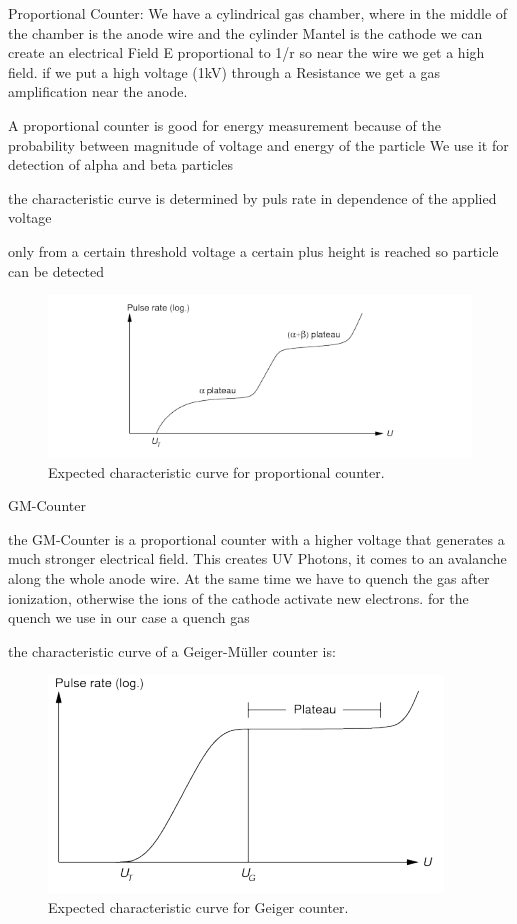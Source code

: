 Proportional Counter:
We have a cylindrical gas chamber, where in the middle of the chamber is the anode wire and the cylinder Mantel
is the cathode
we can create an electrical Field E proportional to 1/r so near the wire we get a high field.
if we put a high voltage (1kV) through a Resistance we get a gas amplification near the anode.

A proportional counter is good for energy measurement because of the probability between magnitude of voltage and energy of the particle 
We use it for detection of alpha and beta particles


the characteristic curve is determined by puls rate in dependence of the applied voltage



only from a certain threshold voltage a certain plus height is reached so particle can be detected

\begin{figure}[H]
\centering
\includegraphics[width=\textwidth]{../Figures/prop.PNG}
\caption{Expected characteristic curve for proportional counter.}
\label{fig:Proportional}
\end{figure}


GM-Counter


the GM-Counter is a proportional counter with a higher voltage that generates a much stronger electrical field.
This creates UV Photons, it comes to an avalanche along the whole anode wire.
At the same time we have to quench the gas after ionization, otherwise the ions of the cathode activate new electrons.
for the quench we use in our case a quench gas 


the characteristic curve of a Geiger-Müller counter is:


\begin{figure}[H]
\centering
\includegraphics[width=\textwidth]{../Figures/Geiger.PNG}
\caption{Expected characteristic curve for Geiger counter.}
\label{fig:Geiger}
\end{figure}


